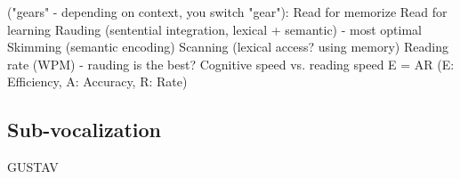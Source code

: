 ("gears" - depending on context, you switch "gear"):
Read for memorize
Read for learning
Rauding (sentential integration, lexical + semantic) - most optimal
Skimming (semantic encoding)
Scanning (lexical access? using memory)
Reading rate (WPM) - rauding is the best?
Cognitive speed vs. reading speed
E = AR (E: Efficiency, A: Accuracy, R: Rate)

\subsection{Sub-vocalization}
GUSTAV